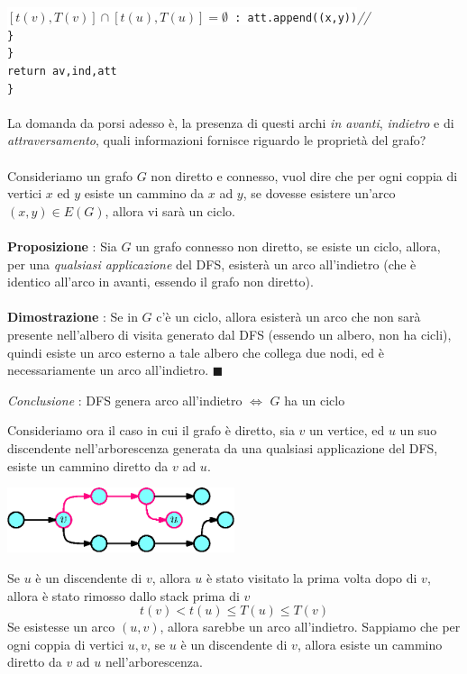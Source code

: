 \documentclass[12pt, letterpaper]{article}
\newcommand{\codee}[1]{\colorbox{white}{\texttt{#1}}}
\newcommand{\acc}{\\\hphantom{}\\}
\newcommand{\comm}[1]{\color{lg}\textit{\hphantom{spaz}// \text{#1}}\color{black}}
\begin{document}
\hphantom{ident}\hphantom{ident}\hphantom{ident}\codee{$[t(v),T(v)]\cap[t(u),T(u)]=\emptyset$ : att.append((x,y))}\comm{si ricade nel terzo caso}\\
\hphantom{ident}\hphantom{ident}\codee{\}}\\
\hphantom{ident}\codee{\}}\\
\hphantom{ident}\codee{return av,ind,att}\\
\codee{\}}\acc
La domanda da porsi adesso è, la presenza di questi archi \textit{in avanti}, \textit{indietro} e di \textit{attraversamento},
quali informazioni fornisce riguardo le proprietà del grafo?\acc Consideriamo un grafo \(G\) non diretto e connesso, vuol dire che per
ogni coppia di vertici \(x\) ed $y$ esiste un cammino da $x$ ad $y$, se dovesse esistere un'arco \((x,y)\in E(G)\), allora
vi sarà un ciclo.\acc
\textbf{Proposizione} : Sia \(G\) un grafo connesso non diretto, se esiste un ciclo, allora, per una
\textit{qualsiasi applicazione} del DFS, esisterà un arco all'indietro (che è identico all'arco in avanti,
essendo il grafo non diretto).\acc
\textbf{Dimostrazione} : Se in \(G\) c'è un ciclo, allora esisterà un arco che non sarà presente nell'albero di visita
generato dal DFS (essendo un albero, non ha cicli), quindi esiste un arco esterno a tale albero che collega due nodi,
ed è necessariamente un arco all'indietro. \(\blacksquare\)
\begin{center}
    \textit{Conclusione} : DFS genera arco all'indietro $\iff$ \(G\) ha un ciclo
\end{center}
Consideriamo ora il caso in cui il grafo è diretto, sia \(v\) un vertice, ed \(u\) un suo discendente nell'arborescenza
generata da una qualsiasi applicazione del DFS, esiste un cammino diretto da \(v\) ad \(u\).\begin{center}
    \includegraphics[width=0.5\textwidth ]{images/discentente.eps}
\end{center}
Se \(u\) è un discendente di \(v\), allora \(u\) è stato visitato la prima volta dopo di \(v\), allora è stato
rimosso dallo stack prima di \(v\) $$t(v)<t(u)\le T(u)\le T(v)$$
Se esistesse un arco $(u,v)$, allora sarebbe un arco all'indietro. Sappiamo che per ogni coppia di vertici
\(u,v\), se \(u\) è un discendente di \(v\), allora esiste un cammino diretto da \(v\) ad \(u\) nell'arborescenza.\acc
\end{document}
